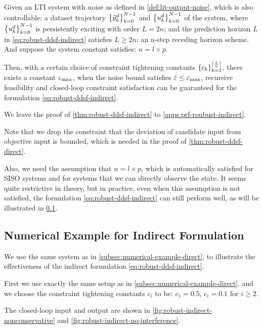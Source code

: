 \begin{theorem}\label{thm:robust-ddsf-indirect}
    Given an LTI system with noise as defined in \cref{def:lit-output-noise}, which is also controllable; a dataset trajectory $\left\{\tilde{y}^d_k\right\}_{k=0}^{N-1}$ and $\left\{u^d_k\right\}_{k=0}^{N-1}$ of the system, where $\left\{u^d_k\right\}_{k=0}^{N-1}$ is persistently exciting with order $L=2n$; and the prediction horizon $L$ in \cref{eq:robust-ddsf-indirect} satisfies $L \geq 2n$; an n-step receding horizon scheme.
    And suppose the system constant satisfies: $n=l \times p$.

    Then, with a certain choice of constraint tightening constants $\left\{c_k\right\}_{k=1}^{\lceil\frac{L}{n}\rceil}$, there exists a constant $\varepsilon_{\text{max}}$, when the noise bound satisfies $\bar{\varepsilon} \leq \varepsilon_{\text{max}}$, recursive feasibility and closed-loop constraint satisfaction can be guaranteed for the formulation \cref{eq:robust-ddsf-indirect}.
\end{theorem}

We leave the proof of \cref{thm:robust-ddsf-indirect} to \cref{apps:prf-roubust-indirect}.

Note that we drop the constraint that the deviation of candidate input from objective input is bounded, which is needed in the proof of \cref{thm:robust-ddsf-direct}.

Also, we need the assumption that $n=l \times p$, which is automatically satisfied for SISO systems and for systems that we can directly observe the state.
It seems quite restrictive in theory, but in practice, even when this assumption is not satisfied, the formulation \cref{eq:robust-ddsf-indirect} can still perform well, as will be illustrated in \cref{subsec:numerical-example-indirect}.

\subsection{Numerical Example for Indirect Formulation}\label{subsec:numerical-example-indirect}

We use the same system as in \cref{subsec:numerical-example-direct}, to illustrate the effectiveness of the indirect formulation \cref{eq:robust-ddsf-indirect}.

First we use exactly the same setup as in \cref{subsec:numerical-example-direct}, and we choose the constraint tightening constants $c_i$ to be: $c_1 = 0.5$, $c_i = 0.1$ for $i \geq 2$.

The closed-loop input and output are shown in \cref{fig:robust-indirect-nonconservative} and \cref{fig:robust-indirect-no-interference}.


